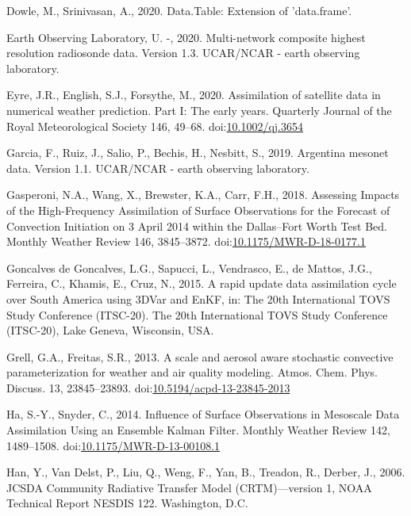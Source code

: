 \documentclass[authoryear,preprint,review,12pt]{elsarticle} %
\begin{document}
\leavevmode\hypertarget{ref-dowle2020}{}%
Dowle, M., Srinivasan, A., 2020. Data.Table: Extension of 'data.frame'.

\leavevmode\hypertarget{ref-sondeos}{}%
Earth Observing Laboratory, U. -, 2020. Multi-network composite highest resolution radiosonde data. Version 1.3. UCAR/NCAR - earth observing laboratory.

\leavevmode\hypertarget{ref-eyre2020}{}%
Eyre, J.R., English, S.J., Forsythe, M., 2020. Assimilation of satellite data in numerical weather prediction. Part I: The early years. Quarterly Journal of the Royal Meteorological Society 146, 49--68. doi:\href{https://doi.org/10.1002/qj.3654}{10.1002/qj.3654}

\leavevmode\hypertarget{ref-garcia2019}{}%
Garcia, F., Ruiz, J., Salio, P., Bechis, H., Nesbitt, S., 2019. Argentina mesonet data. Version 1.1. UCAR/NCAR - earth observing laboratory.

\leavevmode\hypertarget{ref-gasperoni2018}{}%
Gasperoni, N.A., Wang, X., Brewster, K.A., Carr, F.H., 2018. Assessing Impacts of the High-Frequency Assimilation of Surface Observations for the Forecast of Convection Initiation on 3 April 2014 within the Dallas--Fort Worth Test Bed. Monthly Weather Review 146, 3845--3872. doi:\href{https://doi.org/10.1175/MWR-D-18-0177.1}{10.1175/MWR-D-18-0177.1}

\leavevmode\hypertarget{ref-goncalvesdegoncalves2015}{}%
Goncalves de Goncalves, L.G., Sapucci, L., Vendrasco, E., de Mattos, J.G., Ferreira, C., Khamis, E., Cruz, N., 2015. A rapid update data assimilation cycle over South America using 3DVar and EnKF, in: The 20th International TOVS Study Conference (ITSC-20). The 20th International TOVS Study Conference (ITSC-20), Lake Geneva, Wisconsin, USA.

\leavevmode\hypertarget{ref-grell2013}{}%
Grell, G.A., Freitas, S.R., 2013. A scale and aerosol aware stochastic convective parameterization for weather and air quality modeling. Atmos. Chem. Phys. Discuss. 13, 23845--23893. doi:\href{https://doi.org/10.5194/acpd-13-23845-2013}{10.5194/acpd-13-23845-2013}

\leavevmode\hypertarget{ref-ha2014}{}%
Ha, S.-Y., Snyder, C., 2014. Influence of Surface Observations in Mesoscale Data Assimilation Using an Ensemble Kalman Filter. Monthly Weather Review 142, 1489--1508. doi:\href{https://doi.org/10.1175/MWR-D-13-00108.1}{10.1175/MWR-D-13-00108.1}

\leavevmode\hypertarget{ref-han2006}{}%
Han, Y., Van Delst, P., Liu, Q., Weng, F., Yan, B., Treadon, R., Derber, J., 2006. JCSDA Community Radiative Transfer Model (CRTM)---version 1, NOAA Technical Report NESDIS 122. Washington, D.C.
\end{document}
